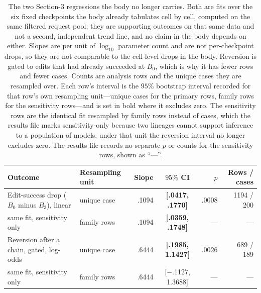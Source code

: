 \documentclass[letterpaper]{article}
\begin{document}
\begin{table}[t]
\centering
\small
\begin{tabular}{@{}llrcrr@{}}
\toprule
Outcome & Resampling unit & Slope & \(95\%\) CI & \(p\) & Rows / cases \\
\midrule
Edit-success drop (\(B_0\) minus \(B_3\)), linear & unique case  & .1094 & \textbf{[.0417, .1770]} & .0008 & 1194 / 200 \\
\quad same fit, sensitivity only            & family rows  & .1094 & \textbf{[.0359, .1748]} & ---   & ---        \\
\addlinespace
Reversion after a chain, gated, log-odds    & unique case  & .6444 & \textbf{[.1985, 1.1427]} & .0026 & 689 / 189 \\
\quad same fit, sensitivity only            & family rows  & .6444 & [$-$.1127, 1.3688]       & ---   & ---       \\
\bottomrule
\end{tabular}
\caption{The two Section-3 regressions the body no longer carries.  Both are
fits over the six fixed checkpoints the body already tabulates cell by cell,
computed on the same filtered request pool; they are supporting outcomes on
that same data and not a second, independent trend line, and no claim in the
body depends on either.  Slopes are per unit of \(\log_{10}\) parameter count
and are not per-checkpoint drops, so they are not comparable to the cell-level
drops in the body.  Reversion is gated to edits that had already succeeded at
\(B_0\), which is why it has fewer rows and fewer cases.  Counts are analysis
rows and the unique cases they are resampled over.  Each row's interval is the
\(95\%\) bootstrap interval recorded for that row's own resampling unit---unique
cases for the primary rows, family rows for the sensitivity rows---and is set in
bold where it excludes zero.  The sensitivity rows are the identical fit
resampled by family rows instead of cases, which the results file marks
sensitivity-only because two lineages cannot support inference to a population of
models; under that unit the reversion interval no longer excludes zero.  The
results file records no separate \(p\) or counts for the sensitivity rows, shown
as ``---''.}
\label{tab:s3b-sunk}
\end{table}
\end{document}
